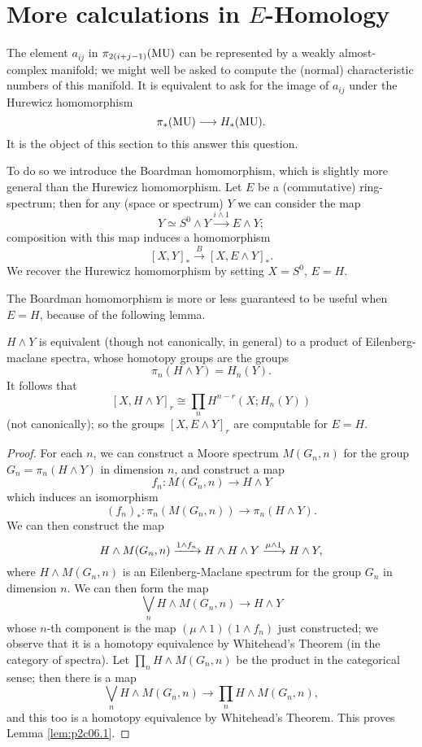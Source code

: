 \documentclass[../main]{subfiles}
\begin{document}
\label{sec:p2c6}
\renewcommand{\labelenumi}{(\roman{enumi})}

\chapter{More calculations in \texorpdfstring{$E$}{E}-Homology}
The element $a_{ij}$ in $\pi_{2(i+j-1)}(\mathrm{MU})$ can be represented by a weakly almost-complex manifold; we might well be asked to compute the (normal) characteristic numbers of this manifold. It is equivalent to ask for the image of $a_{ij}$ under the Hurewicz homomorphism
\[\pi_\ast(\mathrm{MU})\longrightarrow H_\ast(\mathrm{MU}).\]
It is the object of this section to this answer this question.

To do so we introduce the Boardman homomorphism, which is slightly more general than the Hurewicz homomorphism. Let $E$ be a (commutative) ring-spectrum; then for any (space or spectrum) $Y$ we can consider the map 
\[Y\simeq S^0\wedge Y\overset{i\wedge 1}{\longrightarrow} E\wedge Y;\]
composition with this map induces a homomorphism 
\[[X,Y]_\ast\overset{B}{\longrightarrow}[X,E\wedge Y]_\ast.\]
We recover the Hurewicz homomorphism by setting $X=S^0$, $E=H$. 

The Boardman homomorphism is more or less guaranteed to be useful when $E=H$, because of the following lemma.
\begin{lemma}
\label{lem:p2c06.1}
$H\wedge Y$ is equivalent (though not canonically, in general) to a product of Eilenberg-maclane spectra, whose homotopy groups are the groups
\[\pi_n(H\wedge Y)=H_n(Y).\]
It follows that 
\[[X,H\wedge Y]_r \cong \prod_n H^{n-r}(X;H_n(Y))\]
(not canonically); so the groups $[X,E\wedge Y]_r$ are computable for $E=H$.
\end{lemma}
\begin{proof}
For each $n$, we can construct a Moore spectrum $M(G_n,n)$ for the group $G_n=\pi_n(H\wedge Y)$ in dimension $n$, and construct a map 
\[f_n:M(G_n,n)\longrightarrow H\wedge Y\]
which induces an isomorphism
\[(f_n)_\ast:\pi_n(M(G_n,n))\longrightarrow \pi_n(H\wedge Y).\]
We can then construct the map
\[H\wedge M(G_n,n)\vra{1\wedge f_n} H\wedge H\wedge Y \vra{\mu\wedge 1} H\wedge Y,\]
where $H\wedge M(G_n,n)$ is an Eilenberg-Maclane spectrum for the group $G_n$ in dimension $n$. We can then form the map
\[\bigvee_n H\wedge M(G_n,n)\longrightarrow H\wedge Y\]
whose $n$-th component is the map $(\mu\wedge 1)(1\wedge f_n)$ just constructed; we observe that it is a homotopy equivalence by Whitehead's Theorem (in the category of spectra). Let $\prod_n H\wedge M(G_n,n)$ be the product in the categorical sense; then there is a map 
\[\bigvee_n H\wedge M(G_n,n)\longrightarrow \prod_n H\wedge M(G_n,n),\]
and this too is a homotopy equivalence by Whitehead's Theorem. This proves Lemma \ref{lem:p2c06.1}.
\end{proof}
\end{document}
